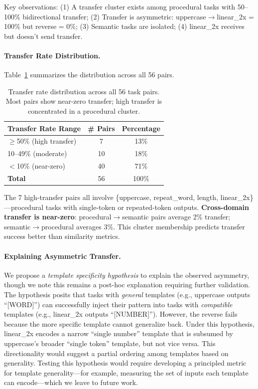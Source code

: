 \documentclass[runningheads]{llncs}
\begin{document}
Key observations: (1) A transfer cluster exists among procedural tasks with 50--100\% bidirectional transfer; (2) Transfer is asymmetric: uppercase$\to$linear\_2x = 100\% but reverse = 0\%; (3) Semantic tasks are isolated; (4) linear\_2x receives but doesn't send transfer.

\paragraph{Transfer Rate Distribution.} Table~\ref{tab:transfer_dist} summarizes the distribution across all 56 pairs.

\begin{table}[h]
\centering
\caption{Transfer rate distribution across all 56 task pairs. Most pairs show near-zero transfer; high transfer is concentrated in a procedural cluster.}
\label{tab:transfer_dist}
\begin{tabular}{@{}lcc@{}}
\toprule
Transfer Rate Range & \# Pairs & Percentage \\
\midrule
$\geq$50\% (high transfer) & 7 & 13\% \\
10--49\% (moderate) & 10 & 18\% \\
$<$10\% (near-zero) & 40 & 71\% \\
\midrule
\textbf{Total} & 56 & 100\% \\
\bottomrule
\end{tabular}
\end{table}

The 7 high-transfer pairs all involve \{uppercase, repeat\_word, length, linear\_2x\}---procedural tasks with single-token or repeated-token outputs. \textbf{Cross-domain transfer is near-zero}: procedural$\to$semantic pairs average 2\% transfer; semantic$\to$procedural averages 3\%. This cluster membership predicts transfer success better than similarity metrics.

\paragraph{Explaining Asymmetric Transfer.} We propose a \emph{template specificity hypothesis} to explain the observed asymmetry, though we note this remains a post-hoc explanation requiring further validation. The hypothesis posits that tasks with \emph{general} templates (e.g., uppercase outputs ``[WORD]'') can successfully inject their pattern into tasks with \emph{compatible} templates (e.g., linear\_2x outputs ``[NUMBER]''). However, the reverse fails because the more specific template cannot generalize back. Under this hypothesis, linear\_2x encodes a narrow ``single number'' template that is subsumed by uppercase's broader ``single token'' template, but not vice versa. This directionality would suggest a partial ordering among templates based on generality. Testing this hypothesis would require developing a principled metric for template generality---for example, measuring the set of inputs each template can encode---which we leave to future work.
\end{document}

